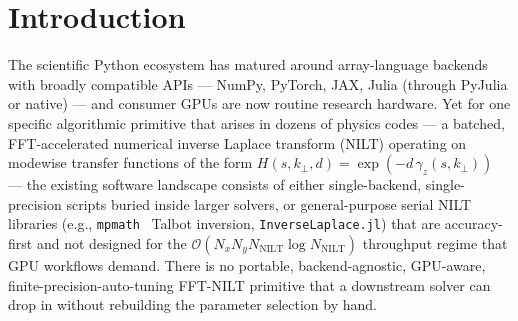 \documentclass[manuscript,review]{acmart}
\newcommand{\kperp}{k_\perp}
\newcommand{\gammaz}{\gamma_z}
\begin{document}

\maketitle

\section{Introduction}\label{sec:intro}

The scientific Python ecosystem has matured around array-language
backends with broadly compatible APIs --- NumPy, PyTorch, JAX, Julia
(through PyJulia or native) --- and consumer GPUs are now routine
research hardware. Yet for one specific algorithmic primitive that
arises in dozens of physics codes ---  a batched, FFT-accelerated
numerical inverse Laplace transform (NILT) operating on modewise
transfer functions of the form $H(s, \kperp, d) = \exp(-d\,\gammaz(s,
\kperp))$ --- the existing software landscape consists of either
single-backend, single-precision scripts buried inside larger
solvers, or general-purpose serial NILT libraries
(e.g., \texttt{mpmath}~\cite{mpmath} Talbot inversion, \texttt{InverseLaplace.jl})
that are accuracy-first and not designed for the
$\mathcal{O}(N_x N_y N_{\mathrm{NILT}}\log N_{\mathrm{NILT}})$
throughput regime that GPU workflows demand. There is no portable,
backend-agnostic, GPU-aware, finite-precision-auto-tuning FFT-NILT
primitive that a downstream solver can drop in without rebuilding
the parameter selection by hand.
\end{document}
